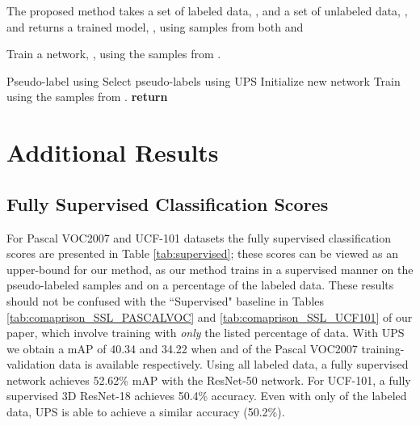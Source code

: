 \documentclass{article} \usepackage{iclr2021_conference,times}
\begin{document}
\begin{algorithm}[h]
\caption{The proposed method takes a set of labeled data, , and a set of unlabeled data, , and returns a trained model, , using samples from both  and }
\label{alg: alogirthm1}
\begin{algorithmic}[1]
\State Train a network, , using the samples from .

 
  \State Pseudo-label  using   
  \State   Select pseudo-labels using UPS  
  \State 
  \State Initialize new network 
  \State Train  using the samples from . 
  \State 
\EndFor
\State \textbf{return} 


\end{algorithmic}
\end{algorithm}





\section{Additional Results}
\label{sec:experiments}


\subsection{Fully Supervised Classification Scores}
For Pascal VOC2007 and UCF-101 datasets the fully supervised classification
scores are presented in Table \ref{tab:supervised}; these scores can be viewed as an upper-bound for our method, as our method trains in a supervised manner on the pseudo-labeled samples and on a percentage of the labeled data. These results should not be confused with the ``Supervised" baseline in Tables \ref{tab:comaprison_SSL_PASCALVOC} and \ref{tab:comaprison_SSL_UCF101} of our paper, which involve training with \textit{only} the listed percentage of data. With UPS we obtain a mAP of 40.34 and 34.22 when  and  of the Pascal VOC2007 training-validation data is available respectively. Using all labeled data, a fully supervised network achieves 52.62\% mAP with the ResNet-50 network. For UCF-101, a fully supervised 3D ResNet-18 achieves 50.4\% accuracy. Even with only  of the labeled data, UPS is able to achieve a similar accuracy (50.2\%).
\end{document}
